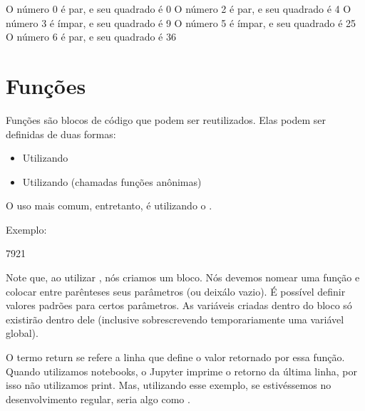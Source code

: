 \documentclass[letterpaper,10pt,english]{jupyterBook}
\begin{document}
\begin{sphinxVerbatim}[commandchars=\\\{\}]
O número 0 é par, e seu quadrado é 0
O número 2 é par, e seu quadrado é 4
O número 3 é ímpar, e seu quadrado é 9
O número 5 é ímpar, e seu quadrado é 25
O número 6 é par, e seu quadrado é 36
\end{sphinxVerbatim}


\section{Funções}
\label{\detokenize{chapters/2:funcoes}}
\sphinxAtStartPar
Funções são blocos de código que podem ser reutilizados. Elas podem ser definidas de duas formas:
\begin{itemize}
\item {} 
\sphinxAtStartPar
Utilizando 

\item {} 
\sphinxAtStartPar
Utilizando  (chamadas funções anônimas)

\end{itemize}

\sphinxAtStartPar
O uso mais comum, entretanto, é utilizando o .

\sphinxAtStartPar
Exemplo:

\begin{sphinxVerbatim}[commandchars=\\\{\}]
 
     

\end{sphinxVerbatim}

\begin{sphinxVerbatim}[commandchars=\\\{\}]
7921
\end{sphinxVerbatim}

\sphinxAtStartPar
Note que, ao utilizar , nós criamos um bloco. Nós devemos nomear uma função e colocar entre parênteses seus parâmetros (ou deixá\sphinxhyphen{}lo vazio). É possível definir valores padrões para certos parâmetros. As variáveis criadas dentro do bloco só existirão dentro dele (inclusive sobrescrevendo temporariamente uma variável global).

\sphinxAtStartPar
O termo return se refere a linha que define o valor retornado por essa função. Quando utilizamos notebooks, o Jupyter imprime o retorno da última linha, por isso não utilizamos print. Mas, utilizando esse exemplo, se estivéssemos no desenvolvimento regular, seria algo como .
\end{document}
